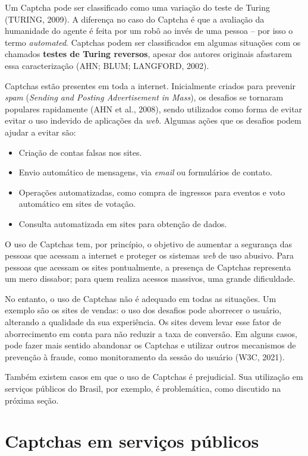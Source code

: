\documentclass[12pt,twoside,brazilian]{book}
\providecommand{\tightlist}{%
  \setlength{\itemsep}{0pt}\setlength{\parskip}{0pt}}
\begin{document}
Um Captcha pode ser classificado como uma variação do teste de Turing
(TURING, 2009). A diferença no caso do Captcha é que a avaliação da
humanidade do agente é feita por um robô ao invés de uma pessoa -- por
isso o termo \emph{automated}. Captchas podem ser classificados em
algumas situações com os chamados \textbf{testes de Turing reversos},
apesar dos autores originais afastarem essa caracterização (AHN; BLUM;
LANGFORD, 2002).

Captchas estão presentes em toda a internet. Inicialmente criados para
prevenir \emph{spam} (\emph{Sending and Posting Advertisement in Mass}),
os desafios se tornaram populares rapidamente (AHN et al., 2008), sendo
utilizados como forma de evitar evitar o uso indevido de aplicações da
\emph{web}. Algumas ações que os desafios podem ajudar a evitar são:

\begin{itemize}
\tightlist
\item
  Criação de contas falsas nos sites.
\item
  Envio automático de mensagens, via \emph{email} ou formulários de
  contato.
\item
  Operações automatizadas, como compra de ingressos para eventos e voto
  automático em sites de votação.
\item
  Consulta automatizada em sites para obtenção de dados.
\end{itemize}

O uso de Captchas tem, por princípio, o objetivo de aumentar a segurança
das pessoas que acessam a internet e proteger os sistemas \emph{web} de
uso abusivo. Para pessoas que acessam os sites pontualmente, a presença
de Captchas representa um mero dissabor; para quem realiza acessos
massivos, uma grande dificuldade.

No entanto, o uso de Captchas não é adequado em todas as situações. Um
exemplo são os sites de vendas: o uso dos desafios pode aborrecer o
usuário, alterando a qualidade da sua experiência. Os sites devem levar
esse fator de aborrecimento em conta para não reduzir a taxa de
conversão. Em alguns casos, pode fazer mais sentido abandonar os
Captchas e utilizar outros mecanismos de prevenção à fraude, como
monitoramento da sessão do usuário (W3C, 2021).

Também existem casos em que o uso de Captchas é prejudicial. Sua
utilização em serviços públicos do Brasil, por exemplo, é problemática,
como discutido na próxima seção.

\hypertarget{sec-captchas-publicos}{%
\section{Captchas em serviços públicos}\label{sec-captchas-publicos}}
\end{document}
